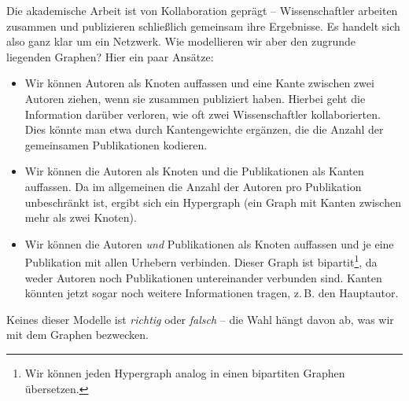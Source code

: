 \begin{example}
    Die akademische Arbeit ist von Kollaboration geprägt -- Wissenschaftler arbeiten zusammen und publizieren schließlich gemeinsam ihre Ergebnisse.
    Es handelt sich also ganz klar um ein Netzwerk.
    Wie modellieren wir aber den zugrunde liegenden Graphen?
    Hier ein paar Ansätze:

    \begin{itemize}
        \item
              Wir können Autoren als Knoten auffassen und eine Kante zwischen zwei Autoren ziehen, wenn sie zusammen publiziert haben.
              Hierbei geht die Information darüber verloren, wie oft zwei Wissenschaftler kollaborierten.
              Dies könnte man etwa durch Kantengewichte ergänzen, die die Anzahl der gemeinsamen Publikationen kodieren.

        \item Wir können die Autoren als Knoten und die Publikationen als Kanten auffassen.
              Da im allgemeinen die Anzahl der Autoren pro Publikation unbeschränkt ist, ergibt sich ein Hypergraph (ein Graph mit Kanten zwischen mehr als zwei Knoten).

        \item Wir können die Autoren \emph{und} Publikationen als Knoten auffassen und je eine Publikation mit allen Urhebern verbinden.
              Dieser Graph ist bipartit\footnote{Wir können jeden Hypergraph analog in einen bipartiten Graphen übersetzen.}, da weder Autoren noch Publikationen untereinander verbunden sind.
              Kanten könnten jetzt sogar noch weitere Informationen tragen, z.\,B. den Hauptautor.\qedhere
    \end{itemize}
\end{example}

\noindent
Keines dieser Modelle ist \emph{richtig} oder \emph{falsch} -- die Wahl hängt davon ab, was wir mit dem Graphen bezwecken.

